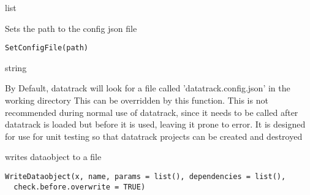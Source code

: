 \documentclass[a4paper]{book}
\begin{document}
%
\begin{Value}
list
\end{Value}
%
\begin{Description}\relax
Sets the path to the config json file
\end{Description}
%
\begin{Usage}
\begin{verbatim}
SetConfigFile(path)
\end{verbatim}
\end{Usage}
%
\begin{Arguments}
\begin{ldescription}
\item[\code{path}] string
\end{ldescription}
\end{Arguments}
%
\begin{Details}\relax
By Default, datatrack will look for a file called 'datatrack.config.json' in the working directory
This can be overridden by this function. This is not recommended during normal use of datatrack,
since it needs to be called after datatrack is loaded but before it is used, leaving it prone to error.
It is designed for use for unit testing so that datatrack projects can be created and destroyed
\end{Details}
%
\begin{Description}\relax
writes dataobject to a file
\end{Description}
%
\begin{Usage}
\begin{verbatim}
WriteDataobject(x, name, params = list(), dependencies = list(),
  check.before.overwrite = TRUE)
\end{verbatim}
\end{Usage}
%
\end{document}
